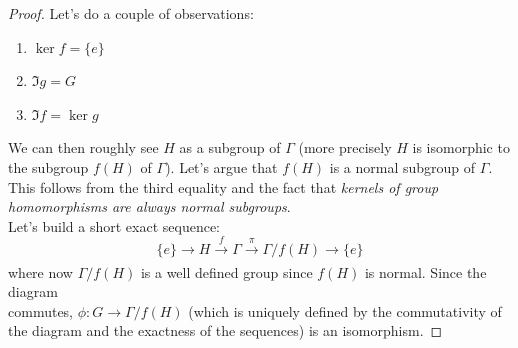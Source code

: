 \begin{proof}
Let's do a couple of observations: 
    \begin{enumerate}
        \item $\ker f = \{e\} $
        \item $\Im g = G$
        \item $\Im f = \ker g$
    \end{enumerate}
We can then roughly see $H$ as a subgroup of $\Gamma$ (more precisely $H$ is isomorphic to the subgroup $f(H)$ of $\Gamma$). Let's argue that $f(H)$ is a normal subgroup of $\Gamma$. This follows from the third equality and the fact that \textit{kernels of group homomorphisms are always normal subgroups}. \\
Let's build a short exact sequence:
\begin{equation*}
      \{e\} \xrightarrow[]{} H  \xrightarrow[]{f} \Gamma \xrightarrow[]{\pi}   \Gamma / f(H) \xrightarrow[]{} \{e\}
\end{equation*}
where now $\Gamma/ f(H)$ is a well defined group since $f(H)$ is normal. Since the diagram\\
commutes, $\phi: G \to \Gamma/f(H)$ (which is uniquely defined by the commutativity of the diagram and the exactness of the sequences) is an isomorphism. 
\end{proof}




